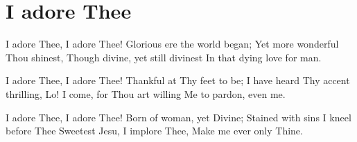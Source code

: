 \starttocol
\chapter{I adore Thee}
\nexttocol
\hfill{\it }
\stoptocol
\starttocol
\startlines
{\sc I adore} Thee, I adore Thee!
Glorious ere the world began;
Yet more wonderful Thou shinest,
Though divine, yet still divinest
In that dying love for man.

I adore Thee, I adore Thee!
Thankful at Thy feet to be;
I have heard Thy accent thrilling,
Lo! I come, for Thou art willing
Me to pardon, even me.

I adore Thee, I adore Thee!
Born of woman, yet Divine;
Stained with sins I kneel before Thee
Sweetest Jesu, I implore Thee,
Make me ever only Thine.
\stoplines
\nexttocol

\stoptocol
